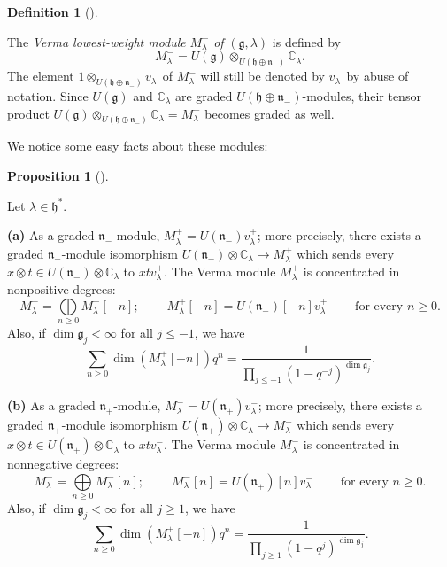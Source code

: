 \documentclass
[numbers=enddot,12pt,final,onecolumn,german,notitlepage]{scrartcl}%
\theoremstyle{definition}
\newtheorem{prop}[theo]{Proposition}
\newenvironment{proposition}[1][]
{\begin{prop}[#1]\begin{leftbar}}
{\end{leftbar}\end{prop}}
\newtheorem{defi}[theo]{Definition}
\newenvironment{definition}[1][]
{\begin{defi}[#1]\begin{leftbar}}
{\end{leftbar}\end{defi}}
\begin{document}
\begin{definition}
The \textit{Verma lowest-weight module }$M_{\lambda}^{-}$ \textit{of }$\left(
\mathfrak{g},\lambda\right)  $ is defined by%
\[
M_{\lambda}^{-}=U\left(  \mathfrak{g}\right)  \otimes_{U\left(  \mathfrak{h}%
\oplus\mathfrak{n}_{-}\right)  }\mathbb{C}_{\lambda}.
\]
The element $1\otimes_{U\left(  \mathfrak{h}\oplus\mathfrak{n}_{-}\right)
}v_{\lambda}^{-}$ of $M_{\lambda}^{-}$ will still be denoted by $v_{\lambda
}^{-}$ by abuse of notation. Since $U\left(  \mathfrak{g}\right)  $ and
$\mathbb{C}_{\lambda}$ are graded $U\left(  \mathfrak{h}\oplus\mathfrak{n}%
_{-}\right)  $-modules, their tensor product $U\left(  \mathfrak{g}\right)
\otimes_{U\left(  \mathfrak{h}\oplus\mathfrak{n}_{-}\right)  }\mathbb{C}%
_{\lambda}=M_{\lambda}^{-}$ becomes graded as well.
\end{definition}

We notice some easy facts about these modules:

\begin{proposition}
\label{prop.verma1}Let $\lambda\in\mathfrak{h}^{\ast}$.

\textbf{(a)} As a graded $\mathfrak{n}_{-}$-module, $M_{\lambda}^{+}=U\left(
\mathfrak{n}_{-}\right)  v_{\lambda}^{+}$; more precisely, there exists a
graded $\mathfrak{n}_{-}$-module isomorphism $U\left(  \mathfrak{n}%
_{-}\right)  \otimes\mathbb{C}_{\lambda}\rightarrow M_{\lambda}^{+}$ which
sends every $x\otimes t\in U\left(  \mathfrak{n}_{-}\right)  \otimes
\mathbb{C}_{\lambda}$ to $xtv_{\lambda}^{+}$. The Verma module $M_{\lambda
}^{+}$ is concentrated in nonpositive degrees:%
\[
M_{\lambda}^{+}=\bigoplus\limits_{n\geq0}M_{\lambda}^{+}\left[  -n\right]
;\ \ \ \ \ \ \ \ \ \ M_{\lambda}^{+}\left[  -n\right]  =U\left(
\mathfrak{n}_{-}\right)  \left[  -n\right]  v_{\lambda}^{+}%
\ \ \ \ \ \ \ \ \ \ \text{for every }n\geq0.
\]
Also, if $\dim\mathfrak{g}_{j}<\infty$ for all $j\leq-1$, we have%
\[
\sum\limits_{n\geq0}\dim\left(  M_{\lambda}^{+}\left[  -n\right]  \right)
q^{n}=\dfrac{1}{\prod\limits_{j\leq-1}\left(  1-q^{-j}\right)  ^{\dim
\mathfrak{g}_{j}}}.
\]


\textbf{(b)} As a graded $\mathfrak{n}_{+}$-module, $M_{\lambda}^{-}=U\left(
\mathfrak{n}_{+}\right)  v_{\lambda}^{-}$; more precisely, there exists a
graded $\mathfrak{n}_{+}$-module isomorphism $U\left(  \mathfrak{n}%
_{+}\right)  \otimes\mathbb{C}_{\lambda}\rightarrow M_{\lambda}^{-}$ which
sends every $x\otimes t\in U\left(  \mathfrak{n}_{+}\right)  \otimes
\mathbb{C}_{\lambda}$ to $xtv_{\lambda}^{-}$. The Verma module $M_{\lambda
}^{-}$ is concentrated in nonnegative degrees:%
\[
M_{\lambda}^{-}=\bigoplus\limits_{n\geq0}M_{\lambda}^{-}\left[  n\right]
;\ \ \ \ \ \ \ \ \ \ M_{\lambda}^{-}\left[  n\right]  =U\left(  \mathfrak{n}%
_{+}\right)  \left[  n\right]  v_{\lambda}^{-}\ \ \ \ \ \ \ \ \ \ \text{for
every }n\geq0.
\]
Also, if $\dim\mathfrak{g}_{j}<\infty$ for all $j\geq1$, we have%
\[
\sum\limits_{n\geq0}\dim\left(  M_{\lambda}^{+}\left[  -n\right]  \right)
q^{n}=\dfrac{1}{\prod\limits_{j\geq1}\left(  1-q^{j}\right)  ^{\dim
\mathfrak{g}_{j}}}.
\]

\end{proposition}
\end{document}
